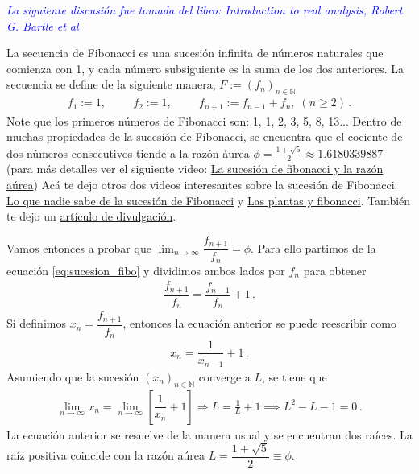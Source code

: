 \documentclass[12pt]{article}
\begin{document}
\begin{cajaflex}

    \textcolor{blue}{\textit{La siguiente discusión fue tomada del libro: 
	Introduction to real analysis, Robert G. Bartle et al}}

    La secuencia de Fibonacci es una sucesión infinita de números 
	naturales que comienza con 1, y cada número subsiguiente es
	la suma de los dos anteriores. 
	La secuencia se define de la siguiente manera, 
	$F:=(f_n)_{n \in \mathbb{N}}$
	\begin{align}\label{eq:sucesion_fibo}
		f_1:=1,\hspace{1cm}f_2:=1,\hspace{1cm}f_{n+1}:=f_{n-1}+f_{n},\;(n\geq 2)\,.
	\end{align}
	Note que los primeros números de Fibonacci son: 1, 1, 2, 3, 5, 8, 13...
	Dentro de muchas propiedades de la sucesión de Fibonacci, 
	se encuentra que el cociente de dos números consecutivos tiende a la razón
	áurea $\phi=\frac{1+\sqrt{5}}{2}\approx 1.6180339887$ (para más detalles 
	ver el siguiente video: \href{https://www.youtube.com/watch?v=yDyMSliKsxI}{La sucesión de fibonacci y la razón aúrea})  
	Acá te dejo otros dos videos interesantes sobre la sucesión de Fibonacci:
	\href{https://www.youtube.com/watch?v=N0gr6nK6lgU}{Lo que nadie sabe de la sucesión 
	de Fibonacci} y \href{http://youtube.com/watch?v=ctRIK56jV3k}{Las plantas y fibonacci}. 
	También te dejo un \href{https://www.bbc.com/mundo/noticias-46926506}{artículo de divulgación}.

	Vamos entonces a probar que $\lim_{n\rightarrow \infty} \dfrac{f_{n+1}}{f_n} = \phi$.
	Para ello partimos de la ecuación \eqref{eq:sucesion_fibo} 
	y dividimos ambos lados por $f_n$ para obtener
	\begin{align}
		\dfrac{f_{n+1}}{f_n} = \dfrac{f_{n-1}}{f_n}+1\,.
	\end{align}
	Si definimos $x_n=\dfrac{f_{n+1}}{f_n}$, entonces la ecuación anterior se 
	puede reescribir como
	\begin{align}
		x_n = \dfrac{1}{x_{n-1}}+1\,.
	\end{align}		
	Asumiendo que la sucesión $(x_n)_{n\in \mathbb{N}}$ converge a  $L$, 
	se tiene que 
	\begin{align}
		\lim_{n\rightarrow \infty} x_n = \lim_{n\rightarrow \infty} \left[ 
			\dfrac{1}{ x_n}+1 \right] \Rightarrow  L = \frac{1}{L} + 1 \implies 
			L^2-L-1=0 \,.
	\end{align}	
	La ecuación anterior se resuelve de la manera usual y se encuentran dos raíces.
	La raíz positiva coincide con la razón aúrea $L=\dfrac{1+\sqrt{5}}{2}\equiv\phi$.

\end{cajaflex}
\end{document}
